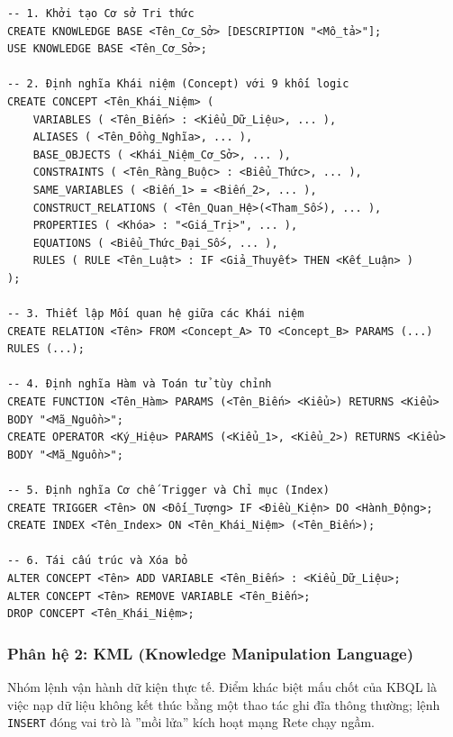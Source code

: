 \documentclass[13pt,a4paper,oneside]{extreport}
\begin{document}
\begin{academicbox}
\begin{Verbatim}[commandchars=\\\{\},breaklines=true,breakanywhere=true,fontfamily=tt,fontsize=\small]
-- 1. Khởi tạo Cơ sở Tri thức
CREATE KNOWLEDGE BASE <Tên_Cơ_Sở> [DESCRIPTION "<Mô_tả>"];
USE KNOWLEDGE BASE <Tên_Cơ_Sở>;

-- 2. Định nghĩa Khái niệm (Concept) với 9 khối logic
CREATE CONCEPT <Tên_Khái_Niệm> (
    VARIABLES ( <Tên_Biến> : <Kiểu_Dữ_Liệu>, ... ),
    ALIASES ( <Tên_Đồng_Nghĩa>, ... ),
    BASE_OBJECTS ( <Khái_Niệm_Cơ_Sở>, ... ),
    CONSTRAINTS ( <Tên_Ràng_Buộc> : <Biểu_Thức>, ... ),
    SAME_VARIABLES ( <Biến_1> = <Biến_2>, ... ),
    CONSTRUCT_RELATIONS ( <Tên_Quan_Hệ>(<Tham_Số>), ... ),
    PROPERTIES ( <Khóa> : "<Giá_Trị>", ... ),
    EQUATIONS ( <Biểu_Thức_Đại_Số>, ... ),
    RULES ( RULE <Tên_Luật> : IF <Giả_Thuyết> THEN <Kết_Luận> )
);

-- 3. Thiết lập Mối quan hệ giữa các Khái niệm
CREATE RELATION <Tên> FROM <Concept_A> TO <Concept_B> PARAMS (...) RULES (...);

-- 4. Định nghĩa Hàm và Toán tử tùy chỉnh
CREATE FUNCTION <Tên_Hàm> PARAMS (<Tên_Biến> <Kiểu>) RETURNS <Kiểu> BODY "<Mã_Nguồn>";
CREATE OPERATOR <Ký_Hiệu> PARAMS (<Kiểu_1>, <Kiểu_2>) RETURNS <Kiểu> BODY "<Mã_Nguồn>";

-- 5. Định nghĩa Cơ chế Trigger và Chỉ mục (Index)
CREATE TRIGGER <Tên> ON <Đối_Tượng> IF <Điều_Kiện> DO <Hành_Động>;
CREATE INDEX <Tên_Index> ON <Tên_Khái_Niệm> (<Tên_Biến>);

-- 6. Tái cấu trúc và Xóa bỏ
ALTER CONCEPT <Tên> ADD VARIABLE <Tên_Biến> : <Kiểu_Dữ_Liệu>;
ALTER CONCEPT <Tên> REMOVE VARIABLE <Tên_Biến>;
DROP CONCEPT <Tên_Khái_Niệm>;
\end{Verbatim}
\end{academicbox}




\subsubsection{Phân hệ 2: KML (Knowledge Manipulation Language)}

Nhóm lệnh vận hành dữ kiện thực tế. Điểm khác biệt mấu chốt của KBQL là việc nạp dữ liệu không kết thúc bằng một thao tác ghi đĩa thông thường; lệnh \texttt{INSERT} đóng vai trò là ''mồi lửa'' kích hoạt mạng Rete chạy ngầm.
\end{document}
